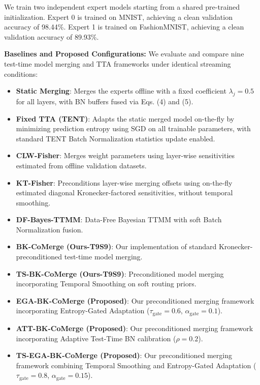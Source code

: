 \documentclass{article}
\theoremstyle{plain}
\theoremstyle{definition}
\theoremstyle{remark}
\begin{document}
We train two independent expert models starting from a shared pre-trained initialization. Expert 0 is trained on MNIST, achieving a clean validation accuracy of 98.44\%. Expert 1 is trained on FashionMNIST, achieving a clean validation accuracy of 89.93\%.

\textbf{Baselines and Proposed Configurations:} We evaluate and compare nine test-time model merging and TTA frameworks under identical streaming conditions:
\begin{itemize}
    \item \textbf{Static Merging}: Merges the experts offline with a fixed coefficient $\lambda_j = 0.5$ for all layers, with BN buffers fused via Eqs. (4) and (5).
    \item \textbf{Fixed TTA (TENT)}: Adapts the static merged model on-the-fly by minimizing prediction entropy using SGD on all trainable parameters, with standard TENT Batch Normalization statistics update enabled.
    \item \textbf{CLW-Fisher}: Merges weight parameters using layer-wise sensitivities estimated from offline validation datasets.
    \item \textbf{KT-Fisher}: Preconditions layer-wise merging offsets using on-the-fly estimated diagonal Kronecker-factored sensitivities, without temporal smoothing.
    \item \textbf{DF-Bayes-TTMM}: Data-Free Bayesian TTMM with soft Batch Normalization fusion.
    \item \textbf{BK-CoMerge (Ours-T9S9)}: Our implementation of standard Kronecker-preconditioned test-time model merging.
    \item \textbf{TS-BK-CoMerge (Ours-T9S9)}: Preconditioned model merging incorporating Temporal Smoothing on soft routing priors.
    \item \textbf{EGA-BK-CoMerge (Proposed)}: Our preconditioned merging framework incorporating Entropy-Gated Adaptation ($\tau_{\text{gate}} = 0.6$, $\alpha_{\text{gate}} = 0.1$).
    \item \textbf{ATT-BK-CoMerge (Proposed)}: Our preconditioned merging framework incorporating Adaptive Test-Time BN calibration ($\rho = 0.2$).
    \item \textbf{TS-EGA-BK-CoMerge (Proposed)}: Our preconditioned merging framework combining Temporal Smoothing and Entropy-Gated Adaptation ($\tau_{\text{gate}} = 0.8$, $\alpha_{\text{gate}} = 0.15$).
\end{itemize}
\end{document}

